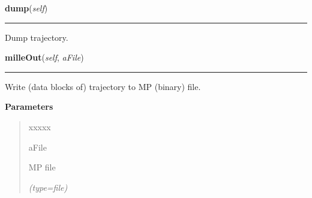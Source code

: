     \label{gblfit:GblTrajectory:dump}

    \vspace{0.5ex}

\hspace{.8\funcindent}\begin{boxedminipage}{\funcwidth}

    \raggedright \textbf{dump}(\textit{self})

    \vspace{-1.5ex}

    \rule{\textwidth}{0.5\fboxrule}
\setlength{\parskip}{2ex}
    Dump trajectory.

\setlength{\parskip}{1ex}
    \end{boxedminipage}

    \label{gblfit:GblTrajectory:milleOut}

    \vspace{0.5ex}

\hspace{.8\funcindent}\begin{boxedminipage}{\funcwidth}

    \raggedright \textbf{milleOut}(\textit{self}, \textit{aFile})

    \vspace{-1.5ex}

    \rule{\textwidth}{0.5\fboxrule}
\setlength{\parskip}{2ex}
    Write (data blocks of) trajectory to MP (binary) file.

\setlength{\parskip}{1ex}
      \textbf{Parameters}
      \vspace{-1ex}

      \begin{quote}
        \begin{Ventry}{xxxxx}

          \item[aFile]

          MP file

            {\it (type=file)}

        \end{Ventry}

      \end{quote}

    \end{boxedminipage}

